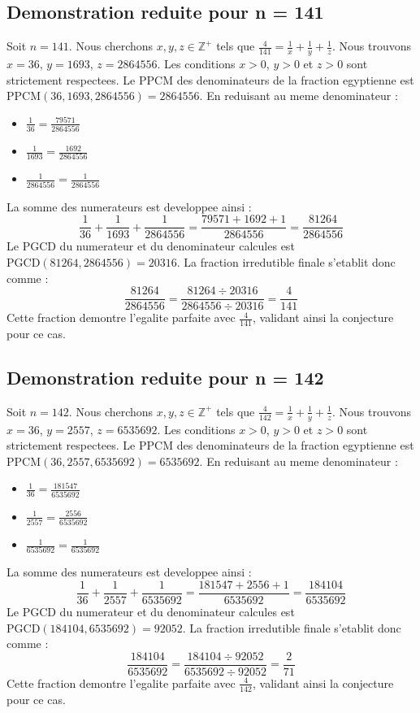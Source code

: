 \documentclass[11pt,a4paper]{article}
\begin{document}
\subsection{Demonstration reduite pour n = 141}
Soit $n = 141$. Nous cherchons $x, y, z \in \mathbb{Z}^{+}$ tels que $\frac{4}{141} = \frac{1}{x} + \frac{1}{y} + \frac{1}{z}$.
Nous trouvons $x = 36$, $y = 1693$, $z = 2864556$.
Les conditions $x > 0$, $y > 0$ et $z > 0$ sont strictement respectees.
Le PPCM des denominateurs de la fraction egyptienne est $\text{PPCM}(36, 1693, 2864556) = 2864556$.
En reduisant au meme denominateur :
\begin{itemize}
    \item $\frac{1}{36} = \frac{79571}{2864556}$
    \item $\frac{1}{1693} = \frac{1692}{2864556}$
    \item $\frac{1}{2864556} = \frac{1}{2864556}$
\end{itemize}
La somme des numerateurs est developpee ainsi :
$$ \frac{1}{36} + \frac{1}{1693} + \frac{1}{2864556} = \frac{79571 + 1692 + 1}{2864556} = \frac{81264}{2864556} $$
Le PGCD du numerateur et du denominateur calcules est $\text{PGCD}(81264, 2864556) = 20316$.
La fraction irredutible finale s'etablit donc comme :
$$ \frac{81264}{2864556} = \frac{81264 \div 20316}{2864556 \div 20316} = \frac{4}{141} $$
Cette fraction demontre l'egalite parfaite avec $\frac{4}{141}$, validant ainsi la conjecture pour ce cas.

\subsection{Demonstration reduite pour n = 142}
Soit $n = 142$. Nous cherchons $x, y, z \in \mathbb{Z}^{+}$ tels que $\frac{4}{142} = \frac{1}{x} + \frac{1}{y} + \frac{1}{z}$.
Nous trouvons $x = 36$, $y = 2557$, $z = 6535692$.
Les conditions $x > 0$, $y > 0$ et $z > 0$ sont strictement respectees.
Le PPCM des denominateurs de la fraction egyptienne est $\text{PPCM}(36, 2557, 6535692) = 6535692$.
En reduisant au meme denominateur :
\begin{itemize}
    \item $\frac{1}{36} = \frac{181547}{6535692}$
    \item $\frac{1}{2557} = \frac{2556}{6535692}$
    \item $\frac{1}{6535692} = \frac{1}{6535692}$
\end{itemize}
La somme des numerateurs est developpee ainsi :
$$ \frac{1}{36} + \frac{1}{2557} + \frac{1}{6535692} = \frac{181547 + 2556 + 1}{6535692} = \frac{184104}{6535692} $$
Le PGCD du numerateur et du denominateur calcules est $\text{PGCD}(184104, 6535692) = 92052$.
La fraction irredutible finale s'etablit donc comme :
$$ \frac{184104}{6535692} = \frac{184104 \div 92052}{6535692 \div 92052} = \frac{2}{71} $$
Cette fraction demontre l'egalite parfaite avec $\frac{4}{142}$, validant ainsi la conjecture pour ce cas.
\end{document}
